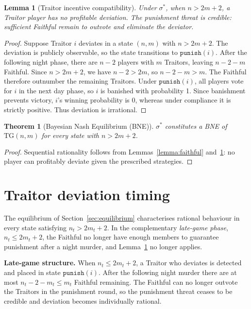 \documentclass[11pt,a4paper]{article}
\newtheorem{theorem}{Theorem}
\newtheorem{lemma}{Lemma}
\begin{document}
\begin{lemma}[Traitor incentive compatibility]\label{lemma:traitor}
Under \(\sigma^*\), when \(n > 2m + 2\), a Traitor player has no
profitable deviation. The punishment threat is credible: sufficient
Faithful remain to outvote and eliminate the deviator.
\end{lemma}

\begin{proof}
Suppose Traitor \(i\) deviates in a state \((n, m)\) with \(n > 2m + 2\).
The deviation is publicly observable, so the state transitions to
\(\mathtt{punish}(i)\). After the following night phase, there are \(n - 2\)
players with \(m\) Traitors, leaving \(n - 2 - m\) Faithful. Since \(n > 2m +
2\), we have \(n - 2 > 2m\), so \(n - 2 - m > m\). The Faithful therefore
outnumber the remaining Traitors. Under \(\mathtt{punish}(i)\), all players
vote for \(i\) in the next day phase, so \(i\) is banished with probability 1.
Since banishment prevents victory, \(i\)'s winning probability is 0, whereas
under compliance it is strictly positive. Thus deviation is irrational.
\end{proof}

\begin{theorem}[Bayesian Nash Equilibrium (BNE)]\label{thm:pbe}
\(\sigma^*\) constitutes a BNE of \(\mathrm{TG}(n, m)\) for every state with
\(n > 2m + 2\).
\end{theorem}

\begin{proof}
Sequential rationality follows from Lemmas~\ref{lemma:faithful}
and~\ref{lemma:traitor}: no player can profitably deviate given the prescribed
strategies.
\end{proof}

\section{Traitor deviation timing}\label{sec:timing}

The equilibrium of Section~\ref{sec:equilibrium} characterises rational
behaviour in every state satisfying \(n_t > 2m_t + 2\). In the
complementary \emph{late-game phase}, \(n_t \leq 2m_t + 2\), the Faithful
no longer have enough members to guarantee punishment after a night murder,
and Lemma~\ref{lemma:traitor} no longer applies.

\textbf{Late-game structure.} When \(n_t \leq 2m_t + 2\), a Traitor who
deviates is detected and placed in state \(\mathtt{punish}(i)\). After the
following night murder there are at most \(n_t - 2 - m_t \leq m_t\)
Faithful remaining. The Faithful can no longer outvote the Traitors in the
punishment round, so the punishment threat ceases to be credible and
deviation becomes individually rational.
\end{document}
